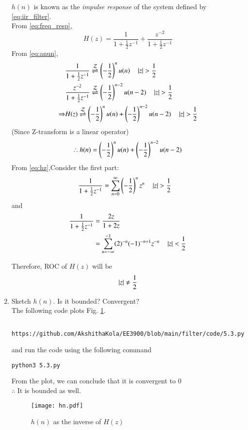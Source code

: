 \documentclass[journal,12pt,twocolumn]{IEEEtran}
\renewcommand\thesection{\arabic{section}}
\begin{document}
\begin{enumerate}[label=\thesection.\arabic*]
$h(n)$ is known as the {\em impulse response} of the
system defined by \eqref{eq:iir_filter}.\\
\solution From \eqref{eq:freq_resp},
\begin{equation}
\label{eq:hz}
H(z) = \frac{1}{1 + \frac{1}{2}z^{-1}} + \frac{ z^{-2}}{1 + \frac{1}{2}z^{-1}}
\end{equation}
From \eqref{eq:anun},
\begin{align}
&\frac{1}{1 + \frac12 z^{-1}} \overset{\mathcal{Z}}{ \rightleftharpoons} \left(-\frac12\right)^n u(n) \quad \left\vert z\right\vert > \frac12 \\
&\frac{z^{-2}}{1 + \frac12 z^{-1}} \overset{\mathcal{Z}}{ \rightleftharpoons} \left(-\frac12\right)^{n-2} u(n-2) \quad \left\vert z\right\vert > \frac12\\
\Rightarrow & H(z) \overset{\mathcal{Z}}{ \rightleftharpoons} \left(-\frac12\right)^n u(n) + \left(-\frac12\right)^{n-2} u(n-2) \quad \left\vert z\right\vert > \frac12\\
\end{align}
(Since Z-transform is a linear operator)
\begin{align}
\therefore h(n) = \left(-\frac12\right)^n u(n) + \left(-\frac12\right)^{n-2} u(n-2) 
\end{align}
From \eqref{eq:hz},Consider the first part:
\begin{align}
\frac{1}{1 + \frac{1}{2}z^{-1}} &= \sum_{n=0}^{\infty}\left(-\frac{1}{2}\right)^n z^n \quad \left\vert z\right\vert > \frac12
\end{align}
and 
\begin{align}
\frac{1}{1 + \frac{1}{2}z^{-1}} &= \frac{2z}{1+2z}\\ &= \sum_{n=-\infty}^{-1}(2)^{-n}(-1)^{-n+1}z^{-n} \quad \left\vert z\right\vert<\frac{1}{2}
\end{align}

Therefore, ROC of $H(z)$ will be
\begin{align}
\left\vert z\right\vert \neq \frac{1}{2}
\end{align}
\item Sketch $h(n)$. Is it bounded? Convergent? \\
\solution The following code plots Fig. \ref{fig:hn}.
\begin{lstlisting}
	https://github.com/AkshithaKola/EE3900/blob/main/filter/code/5.3.py
\end{lstlisting}
and run the code using the following command
\begin{lstlisting}
python3 5.3.py
\end{lstlisting}
From the plot, we can conclude that it is convergent to 0 \\
$\therefore$ It is bounded as well.
\begin{figure}[!ht]
\centering
\texttt{[image: hn.pdf]}
\caption{$h(n)$ as the inverse of $H(z)$}
\label{fig:hn}
\end{figure}


\end{enumerate}
\end{document}
